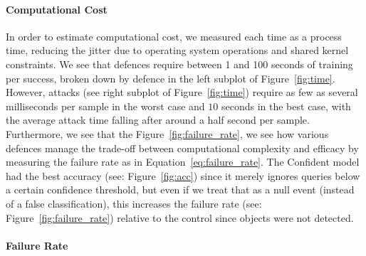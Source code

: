 \documentclass[journal]{IEEEtran}
\begin{document}
\paragraph{Computational Cost}

 In order to estimate computational cost, we measured each time as a process time, reducing the jitter due to operating system operations and shared kernel constraints.
We see that defences require between 1 and 100 seconds of training per success, broken down by defence in the left subplot of Figure~\ref{fig:time}.
However, attacks (see right subplot of Figure~\ref{fig:time}) require as few as several milliseconds per sample in the worst case and $10$ seconds in the best case, with the average attack time falling after around a half second per sample.
Furthermore, we see that the  Figure~\ref{fig:failure_rate}, we see how various defences manage the trade-off between computational complexity and efficacy by measuring the failure rate as in Equation~\ref{eq:failure_rate}.
The Confident model had the best accuracy (see: Figure~\ref{fig:acc}) since it merely ignores queries below a certain confidence threshold, but even if we treat that as a null event (instead of a false classification), this increases the failure rate (see: Figure~\ref{fig:failure_rate}) relative to the control since objects were not detected.


\paragraph{Failure Rate}
\end{document}
